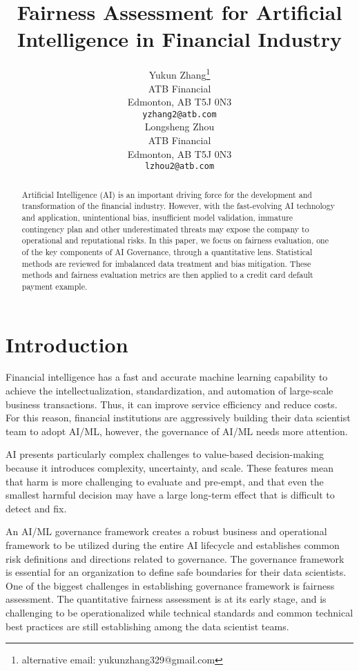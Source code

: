 \documentclass{article}
\title{Fairness Assessment for Artificial Intelligence in Financial Industry}
\author{%
  Yukun Zhang\thanks{alternative email: yukunzhang329@gmail.com} \\
  ATB Financial\\
   Edmonton, AB T5J 0N3 \\
  \texttt{yzhang2@atb.com} \\
   \And
   Longsheng Zhou \\
   ATB Financial \\
   Edmonton, AB T5J 0N3 \\
  \texttt{lzhou2@atb.com} \\
}
\begin{document}
\maketitle

\begin{abstract}
 Artificial Intelligence (AI) is an important driving force for the development and transformation of the financial industry. However, with the fast-evolving AI technology and application, unintentional bias, insufficient model validation, immature contingency plan and other underestimated threats may expose the company to operational and reputational risks.  In this paper, we focus on fairness evaluation, one of the key components of AI Governance, through a quantitative lens. Statistical methods are reviewed for imbalanced data treatment and bias mitigation. These methods and fairness evaluation metrics are then applied to a credit card default payment example. 

\end{abstract}

\section{Introduction}


Financial intelligence has a fast and accurate machine learning capability to achieve the intellectualization, standardization, and automation of large-scale business transactions. Thus, it can improve service efficiency and reduce costs. For this reason, financial institutions are aggressively building their data scientist team to adopt AI/ML, however, the governance of AI/ML needs more attention. 


AI presents particularly complex challenges to value-based decision-making because it introduces complexity, uncertainty, and scale. These features mean that harm is more challenging to evaluate and pre-empt, and that even the smallest harmful decision may have a large long-term effect that is difficult to detect and fix.

An AI/ML governance framework creates a robust business and operational framework to be utilized during the entire AI lifecycle and establishes common risk definitions and directions related to governance. The governance framework is essential for an organization to define safe boundaries for their data scientists. One of the biggest challenges in establishing governance framework is fairness assessment. The quantitative fairness assessment is at its early stage, and is challenging to be operationalized while technical standards and common technical best practices are still establishing among the data scientist teams. 
\end{document}
